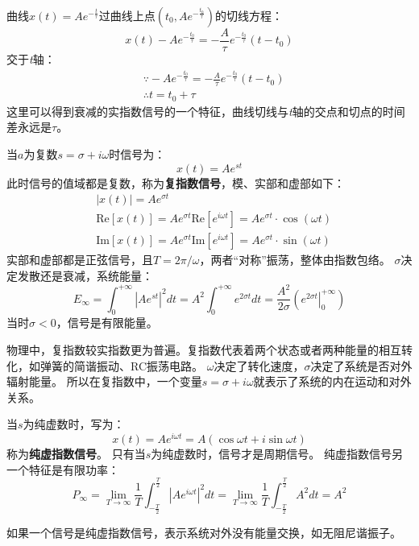 \begin{tcolorbox}
曲线$x\left( t \right) =Ae^{-\frac{t}{\tau}}$过曲线上点$\left( t_0,Ae^{-\frac{t_0}{\tau}} \right) $的切线方程：
\[
x\left( t \right) -Ae^{-\frac{t_0}{\tau}}=-\frac{A}{\tau}e^{-\frac{t_0}{\tau}}\left( t-t_0 \right)
\]
交于{\it t}轴：
\begin{align*}
&\because -Ae^{-\frac{t_0}{\tau}}=-\frac{A}{\tau}e^{-\frac{t_0}{\tau}}\left( t-t_0 \right) \\
&\therefore t=t_0+\tau
\end{align*}
这里可以得到衰减的实指数信号的一个特征，曲线切线与{\it t}轴的交点和切点的时间差永远是$\tau $。
\end{tcolorbox}

当$a$为复数$s=\sigma +i\omega $时信号为：
\[
x\left( t \right) =Ae^{st}
\]
此时信号的值域都是复数，称为{\bf 复指数信号}，模、实部和虚部如下：
\begin{align*}
&\left| x\left( t \right) \right|=Ae^{\sigma t} \\
&\mathrm{Re}\left[ x\left( t \right) \right] =Ae^{\sigma t}\mathrm{Re}\left[ e^{i\omega t} \right] =Ae^{\sigma t}\cdot \cos \left( \omega t \right) \\
&\mathrm{Im}\left[ x\left( t \right) \right] =Ae^{\sigma t}\mathrm{Im}\left[ e^{i\omega t} \right] =Ae^{\sigma t}\cdot \sin \left( \omega t \right)
\end{align*}
实部和虚部都是正弦信号，且$T=2\pi /\omega $，两者“对称”振荡，整体由指数包络。
$\sigma $决定发散还是衰减，系统能量：
\[
E_{\infty}=\int_0^{+\infty}{\left| Ae^{st} \right|^2dt}=A^2\int_0^{+\infty}{e^{2\sigma t}dt}=\frac{A^2}{2\sigma}\left( \left. e^{2\sigma t} \right|_{0}^{+\infty} \right)
\]
当时$\sigma <0$，信号是有限能量。

物理中，复指数较实指数更为普遍。复指数代表着两个状态或者两种能量的相互转化，如弹簧的简谐振动、RC振荡电路。
$\omega $决定了转化速度，$\sigma $决定了系统是否对外辐射能量。
所以在复指数中，一个变量$s=\sigma +i\omega $就表示了系统的内在运动和对外关系。

当$s$为纯虚数时，写为：
\[
x\left( t \right) =Ae^{i\omega t}=A\left( \cos \omega t+i\sin \omega t \right)
\]
称为{\bf 纯虚指数信号}。
只有当$s$为纯虚数时，信号才是周期信号。
纯虚指数信号另一个特征是有限功率：
\[
P_{\infty}=\underset{T\rightarrow \infty}\lim \frac{1}{T}\int_{-\frac{T}{2}}^{\frac{T}{2}}{\left| Ae^{i\omega t} \right|^2dt}=\underset{T\rightarrow \infty}\lim \frac{1}{T}\int_{-\frac{T}{2}}^{\frac{T}{2}}{A^2dt}=A^2
\]

如果一个信号是纯虚指数信号，表示系统对外没有能量交换，如无阻尼谐振子。

